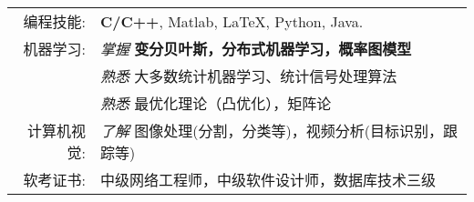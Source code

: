 %
%


 
\renewcommand{\arraystretch}{1.1}

	\begin{tabular}{>{}r>{}p{13cm}} 
		\textsc{编程技能:}      &  \textbf{C/C++}, Matlab, \LaTeX, Python, Java.\\  
		\textsc{机器学习:} 		&  \emph{掌握} \textbf{变分贝叶斯，分布式机器学习，概率图模型} \\
							   &  \emph{熟悉}  大多数统计机器学习、统计信号处理算法 \\
							   &  \emph{熟悉}  最优化理论（凸优化），矩阵论 \\
		\textsc{计算机视觉:}	   &  \emph{了解}  图像处理(分割，分类等)，视频分析(目标识别，跟踪等)  \\
		\textsc{软考证书:}	    &  中级网络工程师，中级软件设计师，数据库技术三级\\
	\end{tabular}
	
